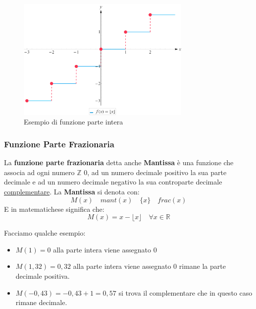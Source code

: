 \documentclass{article}
\begin{document}
\begin{figure}[h]
        \centering
                \includegraphics[width=0.75\textwidth]{esempio_funzione_parte_intera.png}
        \caption{Esempio di funzione parte intera}\label{fig:esempio_funzione_parte_intera}
\end{figure}


\subsubsection{Funzione Parte Frazionaria}\label{sec:funzione_parte_frazionaria}
La \textbf{funzione parte frazionaria} detta anche \textbf{Mantissa} è una funzione che associa ad ogni numero $ \mathbb{Z} $ 0, ad un numero decimale positivo la sua parte decimale e ad un numero decimale negativo la sua controparte decimale \underline{complementare}.
La \textbf{Mantissa} si denota con:
\begin{equation*}
        M(x) \quad mant(x) \quad \{x\} \quad frac(x) 
\end{equation*}
E in matematichese significa che:
\begin{equation*}
        M(x) = x - \lfloor x \rfloor \quad \forall x \in \mathbb{R}
\end{equation*}

Facciamo qualche esempio:
\begin{itemize}
        \item $ M(1) = 0 $ alla parte intera viene assegnato $ 0 $  
        \item $ M(1,32) = 0,32 $ alla parte intera viene assegnato $ 0 $ rimane la parte decimale positiva.
        \item $ M(-0,43) = -0,43 + 1 = 0,57 $ si trova il complementare che in questo caso rimane decimale. 
\end{itemize} 
\end{document}
